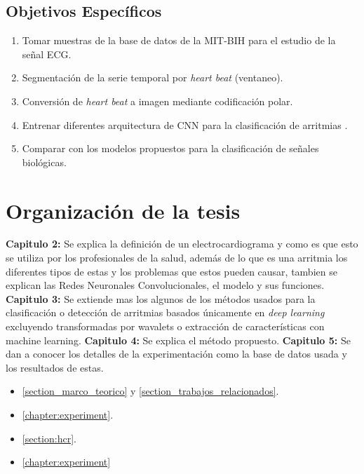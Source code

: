 \subsection{Objetivos Específicos}
\begin{enumerate}
    \item Tomar muestras de la base de datos de la MIT-BIH para el estudio de la señal ECG.
    \item Segmentación de la serie temporal por \textit{heart beat} (ventaneo).
    \item Conversión de \textit{heart beat} a imagen mediante codificación polar.
    \item Entrenar diferentes arquitectura de CNN para la clasificación de arritmias .  
    \item Comparar con los modelos propuestos para la clasificación de señales biológicas.
    
\end{enumerate}

\section{Organización de la tesis}

\textbf{Capitulo 2:} Se explica la definición de un electrocardiograma y como es que esto se utiliza por los profesionales de la salud, además de lo que es una arritmia los diferentes tipos de estas y los problemas que estos pueden causar, tambien se explican las Redes Neuronales Convolucionales, el modelo y sus funciones.
\textbf{Capitulo 3:} Se extiende mas los algunos de los métodos usados para la clasificación o detección de arritmias basados únicamente en \textit{deep learning} excluyendo transformadas por wavalets o extracción de características con machine learning.
\textbf{Capitulo 4:} Se explica el método propuesto. 
\textbf{Capitulo 5:} Se dan a conocer los detalles de la experimentación como la base de datos usada y los resultados de estas. 



\begin{itemize}
    \item  \ref{section_marco_teorico} y \ref{section_trabajos_relacionados}.
    
    
    \item  \ref{chapter:experiment}.
    
    \item  \ref{section:hcr}.
    
    \item \ref{chapter:experiment}
\end{itemize}

